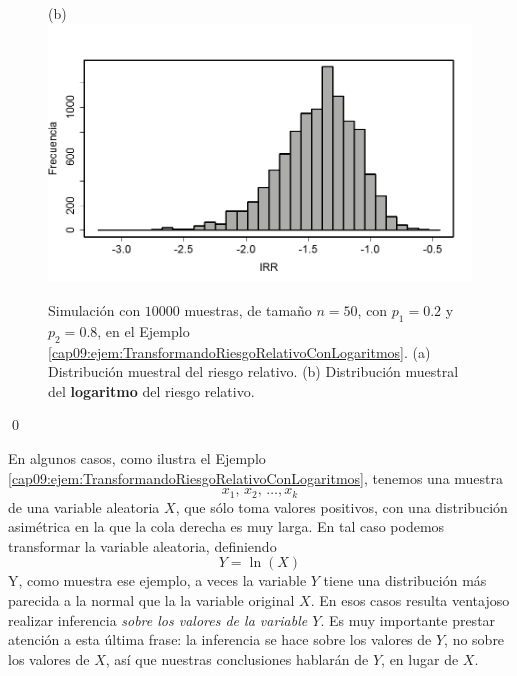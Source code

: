 \begin{ejemplo}
\begin{figure}[p]
\begin{center}
\begin{bn}
(b)\\[3mm]
\includegraphics[width=13cm]{../fig/Cap09-EjemploLogRR06-bn.png}
\end{bn}
\caption{Simulación con $10000$ muestras, de tamaño $n=50$, con $p_1=0.2$ y $p_2=0.8$, en el Ejemplo \ref{cap09:ejem:TransformandoRiesgoRelativoConLogaritmos}. (a) Distribución muestral  del riesgo relativo. (b) Distribución muestral del {\bf logaritmo} del riesgo relativo.}
\label{cap06:fig:EjemploLogRR03}
\end{center}
\end{figure}
\qed
\end{ejemplo}

En algunos casos, como ilustra el Ejemplo \ref{cap09:ejem:TransformandoRiesgoRelativoConLogaritmos},  tenemos una muestra
\[x_1,\,x_2,\,\ldots,x_k\]
de una variable aleatoria $X$, que sólo toma valores positivos, con una distribución asimétrica en la que la cola derecha es muy larga. En tal caso podemos {\sf transformar} la variable aleatoria, definiendo
\begin{equation}
\label{cap09:ecu:TransformacionVariablesConLogaritmo}
Y=\ln(X)
\end{equation}
Y, como muestra ese ejemplo, a veces la variable $Y$ tiene una distribución más parecida a la normal que la la variable original $X$. En esos casos resulta ventajoso realizar inferencia {\em sobre los valores de la variable $Y$}. Es muy importante prestar atención a esta última frase: la inferencia se hace sobre los valores de $Y$, no sobre los valores de $X$, así que nuestras conclusiones hablarán de $Y$, en lugar de $X$.



